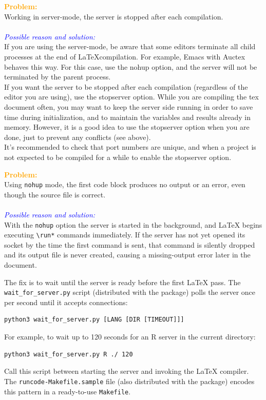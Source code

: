 \documentclass[a4paper,10pt]{article}
\newcommand{\prob}[1] {\bigskip\noindent\textbf{\textcolor{orange}{Problem:}}\\#1\\\\}
\newcommand{\cause}[1] {\noindent\textit{\textcolor{blue}{Possible reason and solution:}}\\#1}
\begin{document}


\prob{Working in server-mode, the server is stopped after each compilation.}
\cause\bgroup
If you are using the server-mode, be aware that some editors terminate all child processes at the end of \LaTeX compilation. For example, Emacs with Auctex behaves this way. For this case, use the nohup option, and the server will not be terminated by the parent process.\\
If you want the server to be stopped after each compilation (regardless of the editor you are using), use the stopserver option. While you are compiling the tex document often, you may want to keep the server side running in order to save time during initialization, and to maintain the variables and results already in memory. However, it is a good idea to use the stopserver option when you are done, just to prevent any conflicts (see above).\\
It's recommended to check that port numbers are unique, and when a project is not expected to be compiled for a while to enable the stopserver option.
\egroup




\prob{Using \texttt{nohup} mode, the first code block produces no output or an error, even though the source file is correct.}
\cause\bgroup
With the \texttt{nohup} option the server is started in the background, and \LaTeX{} begins executing \verb|\run*| commands immediately. If the server has not yet opened its socket by the time the first command is sent, that command is silently dropped and its output file is never created, causing a missing-output error later in the document.

The fix is to wait until the server is ready before the first \LaTeX{} pass. The \verb|wait_for_server.py| script (distributed with the package) polls the server once per second until it accepts connections:
\begin{Verbatim}
python3 wait_for_server.py [LANG [DIR [TIMEOUT]]]
\end{Verbatim}
For example, to wait up to 120 seconds for an R server in the current directory:
\begin{Verbatim}
python3 wait_for_server.py R ./ 120
\end{Verbatim}
Call this script between starting the server and invoking the \LaTeX{} compiler. The \verb|runcode-Makefile.sample| file (also distributed with the package) encodes this pattern in a ready-to-use \verb|Makefile|.
\egroup
\end{document}
